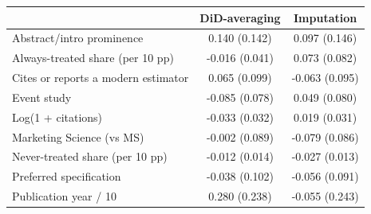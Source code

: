 \begin{tabular}{lcc}
\toprule
 & DiD-averaging & Imputation \\
\midrule
Abstract/intro prominence & 0.140 (0.142) & 0.097 (0.146) \\
Always-treated share (per 10 pp) & -0.016 (0.041) & 0.073 (0.082) \\
Cites or reports a modern estimator & 0.065 (0.099) & -0.063 (0.095) \\
Event study & -0.085 (0.078) & 0.049 (0.080) \\
Log(1 + citations) & -0.033 (0.032) & 0.019 (0.031) \\
Marketing Science (vs MS) & -0.002 (0.089) & -0.079 (0.086) \\
Never-treated share (per 10 pp) & -0.012 (0.014) & -0.027 (0.013) \\
Preferred specification & -0.038 (0.102) & -0.056 (0.091) \\
Publication year / 10 & 0.280 (0.238) & -0.055 (0.243) \\
\bottomrule
\end{tabular}
